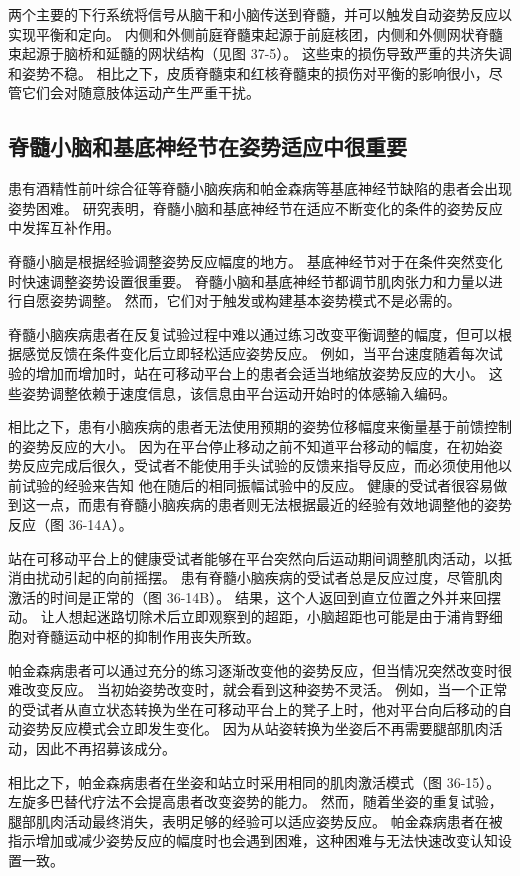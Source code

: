 两个主要的下行系统将信号从脑干和小脑传送到脊髓，并可以触发自动姿势反应以实现平衡和定向。 内侧和外侧前庭脊髓束起源于前庭核团，内侧和外侧网状脊髓束起源于脑桥和延髓的网状结构（见图 37-5）。 这些束的损伤导致严重的共济失调和姿势不稳。 相比之下，皮质脊髓束和红核脊髓束的损伤对平衡的影响很小，尽管它们会对随意肢体运动产生严重干扰。

\subsection{脊髓小脑和基底神经节在姿势适应中很重要}
患有酒精性前叶综合征等脊髓小脑疾病和帕金森病等基底神经节缺陷的患者会出现姿势困难。 研究表明，脊髓小脑和基底神经节在适应不断变化的条件的姿势反应中发挥互补作用。

脊髓小脑是根据经验调整姿势反应幅度的地方。 基底神经节对于在条件突然变化时快速调整姿势设置很重要。 脊髓小脑和基底神经节都调节肌肉张力和力量以进行自愿姿势调整。 然而，它们对于触发或构建基本姿势模式不是必需的。

脊髓小脑疾病患者在反复试验过程中难以通过练习改变平衡调整的幅度，但可以根据感觉反馈在条件变化后立即轻松适应姿势反应。 例如，当平台速度随着每次试验的增加而增加时，站在可移动平台上的患者会适当地缩放姿势反应的大小。 这些姿势调整依赖于速度信息，该信息由平台运动开始时的体感输入编码。

相比之下，患有小脑疾病的患者无法使用预期的姿势位移幅度来衡量基于前馈控制的姿势反应的大小。 因为在平台停止移动之前不知道平台移动的幅度，在初始姿势反应完成后很久，受试者不能使用手头试验的反馈来指导反应，而必须使用他以前试验的经验来告知 他在随后的相同振幅试验中的反应。 健康的受试者很容易做到这一点，而患有脊髓小脑疾病的患者则无法根据最近的经验有效地调整他的姿势反应（图 36-14A）。

站在可移动平台上的健康受试者能够在平台突然向后运动期间调整肌肉活动，以抵消由扰动引起的向前摇摆。 患有脊髓小脑疾病的受试者总是反应过度，尽管肌肉激活的时间是正常的（图 36-14B）。 结果，这个人返回到直立位置之外并来回摆动。 让人想起迷路切除术后立即观察到的超距，小脑超距也可能是由于浦肯野细胞对脊髓运动中枢的抑制作用丧失所致。

帕金森病患者可以通过充分的练习逐渐改变他的姿势反应，但当情况突然改变时很难改变反应。 当初始姿势改变时，就会看到这种姿势不灵活。 例如，当一个正常的受试者从直立状态转换为坐在可移动平台上的凳子上时，他对平台向后移动的自动姿势反应模式会立即发生变化。 因为从站姿转换为坐姿后不再需要腿部肌肉活动，因此不再招募该成分。

相比之下，帕金森病患者在坐姿和站立时采用相同的肌肉激活模式（图 36-15）。 左旋多巴替代疗法不会提高患者改变姿势的能力。 然而，随着坐姿的重复试验，腿部肌肉活动最终消失，表明足够的经验可以适应姿势反应。 帕金森病患者在被指示增加或减少姿势反应的幅度时也会遇到困难，这种困难与无法快速改变认知设置一致。


